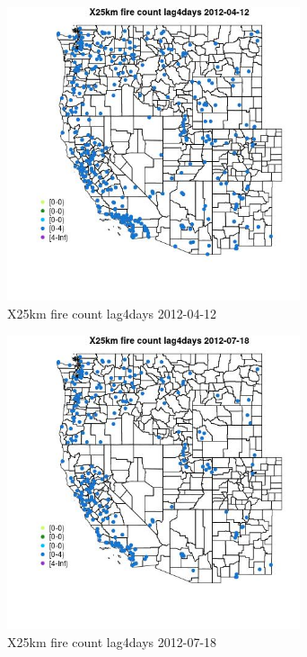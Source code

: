 \begin{figure} 
\centering  
\includegraphics[width=0.77\textwidth]{Code_Outputs/Report_ML_input_PM25_Step4_part_e_de_duplicated_aves_compiled_2019-05-14wNAs_MapObsX25km_fire_count_lag4days2012-04-12.jpg} 
\caption{\label{fig:Report_ML_input_PM25_Step4_part_e_de_duplicated_aves_compiled_2019-05-14wNAsMapObsX25km_fire_count_lag4days2012-04-12}X25km fire count lag4days 2012-04-12} 
\end{figure} 
 

\begin{figure} 
\centering  
\includegraphics[width=0.77\textwidth]{Code_Outputs/Report_ML_input_PM25_Step4_part_e_de_duplicated_aves_compiled_2019-05-14wNAs_MapObsX25km_fire_count_lag4days2012-07-18.jpg} 
\caption{\label{fig:Report_ML_input_PM25_Step4_part_e_de_duplicated_aves_compiled_2019-05-14wNAsMapObsX25km_fire_count_lag4days2012-07-18}X25km fire count lag4days 2012-07-18} 
\end{figure} 
 

